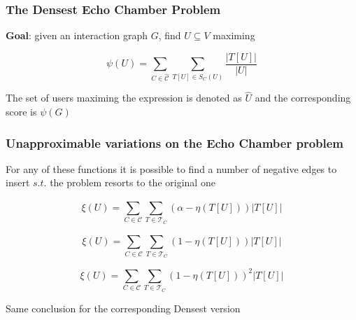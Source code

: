\documentclass{beamer}
\begin{document}
\begin{frame}[c]
	\frametitle{The Densest Echo Chamber Problem}
	\textbf{Goal}: given an interaction graph $G$, find $U \subseteq V$ maximing

	\begin{equation}
		\psi (U) = \sum^{}_{C \in \hat{\mathcal{C}} } \sum^{}_{T[U] \in S_C (U)}
		\frac{| T[U] |}{|U|}
	\end{equation}

	The set of users maximing the expression is denoted as $\hat{U}$ and the
	corresponding score is $\psi(G)$
\end{frame}




\begin{frame}[c]
	\frametitle{Unapproximable variations on the Echo Chamber problem}
	For any of these functions it is possible to find a number of negative
	edges to insert $s.t.$ the problem resorts to the original one

	\begin{equation*}
		\xi(U) = \sum^{}_{C \in \mathcal{C} } \sum^{}_{T \in \mathcal{T}_{C}  }
		(\alpha - \eta(T[U])) |T[U]|
	\end{equation*}

	\begin{equation*}
		\xi(U) = \sum^{}_{C \in \mathcal{C} } \sum^{}_{T \in \mathcal{T}_{C}  }
		(1 - \eta(T[U])) |T[U]|
	\end{equation*}

	\begin{equation*}
		\xi(U) = \sum^{}_{C \in \mathcal{C} } \sum^{}_{T \in \mathcal{T}_{C}  }
		(1 - \eta(T[U]))^{2}  |T[U]|
	\end{equation*}

	Same conclusion for the corresponding Densest version

\end{frame}
\end{document}

